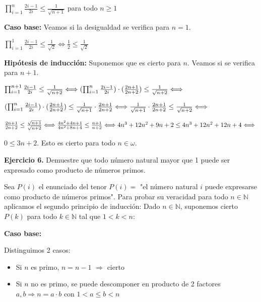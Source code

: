 \documentclass[a4papper, 11pt]{article}
\begin{document}
\begin{flushleft}
	\hfil $\prod_{i=1}^{n} \frac{2i-1}{2i} \leq \frac{1}{\sqrt{n+1}}$ \newline
	para todo $n \geq 1$ \newline
	
	\textbf{Caso base:} Veamos si la desigualdad se verifica para $n = 1$. \newline
	
	\hfil $\prod_{i=1}^{1} \frac{2i-1}{2i} \leq \frac{1}{\sqrt{2}} \Longleftrightarrow \frac{1}{2} \leq \frac{1}{\sqrt{2}}$ \newline
	
	\textbf{Hipótesis de inducción:} Suponemos que es cierto para $n$. Veamos si se verifica para $n+1$. \newline
	
	$\prod_{i=1}^{n+1} \frac{2i-1}{2i} \leq \frac{1}{\sqrt{n+2}} \Longleftrightarrow (\prod_{i=1}^{n} \frac{2i-1}{2i}) \cdot (\frac{2n + 1}{2n+2}) \leq \frac{1}{\sqrt{n+2}} \Longleftrightarrow \newline$
	
	$(\prod_{i=1}^{n} \frac{2i-1}{2i}) \cdot (\frac{2n + 1}{2n+2}) \leq \frac{1}{\sqrt{n+1}} \cdot \frac{2n + 1}{2n+2} \Longleftrightarrow \frac{1}{\sqrt{n+1}} \cdot \frac{2n + 1}{2n+2} \leq \frac{1}{\sqrt{n+2}} \Longleftrightarrow \newline$
	
	$\frac{2n + 1}{2n+2} \leq \frac{\sqrt{n+1}}{\sqrt{n+2}} \Longleftrightarrow \frac{4n^{2} + 4n + 1}{4n^{2} + 8n + 4} \leq \frac{n+1}{n+2} \Longleftrightarrow 4n^{3} + 12n^{2} + 9n + 2 \leq 4n^{3} + 12n^{2} + 12n + 4 \Longleftrightarrow \newline$
	
	$0 \leq 3n + 2$. Esto es cierto para todo $ n \in \omega$. \newline
	
	\textbf{Ejercicio 6.} Demuestre que todo número natural mayor que 1 puede ser expresado como producto de números primos. \newline
	
	Sea $P(i)$ el enunciado del tenor $P(i) = $ "el número natural $i$ puede expresarse como producto de números primos". Para probar su veracidad para todo $n \in \mathbb{N}$ aplicamos el segundo principio de inducción: Dado $n \in \mathbb{N}$, suponemos cierto $P(k)$ para todo $k \in \mathbb{N}$ tal que $1 < k < n$:\newline
	
	\textbf{Caso base:} 
	
	Distinguimos 2 casos: 
	\begin{itemize}
		\item Si $n$ es primo, $n = n-1$ $\Rightarrow$ cierto
		\item Si $n$ no es primo, se puede descomponer en producto de 2 factores $a,b \Rightarrow n = a \cdot b$ con $1 < a \leq b < n$
	\end{itemize}
	

\end{flushleft}
\end{document}
